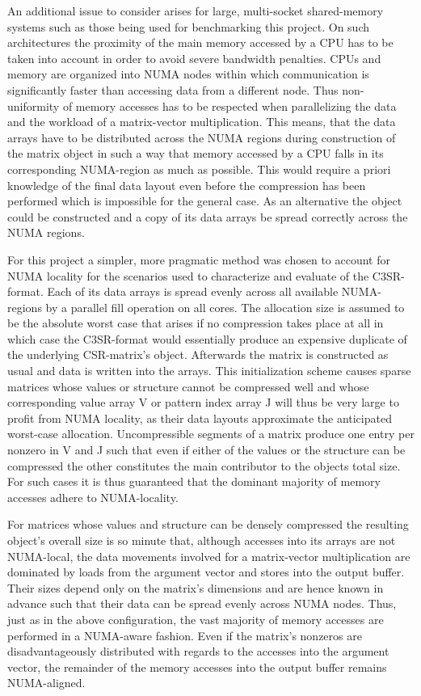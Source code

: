     An additional issue to consider arises for large, multi-socket shared-memory systems such as those being used for
    benchmarking this project. On such architectures the proximity of the main memory accessed by a CPU has to be taken
    into account in order to avoid severe bandwidth penalties. CPUs and memory are organized into NUMA nodes within
    which communication is significantly faster than accessing data from a different node. Thus non-uniformity of memory
    accesses has to be respected when parallelizing the data and the workload of a matrix-vector multiplication. This
    means, that the data arrays have to be distributed across the NUMA regions during construction of the matrix object
    in such a way that memory accessed by a CPU falls in its corresponding NUMA-region as much as possible. This
    would require a priori knowledge of the final data layout even before the compression has been performed which is
    impossible for the general case. As an alternative the object could be constructed and a copy of its data arrays be
    spread correctly across the NUMA regions.

    For this project a simpler, more pragmatic method was chosen to account for NUMA locality for the scenarios used to
    characterize and evaluate of the C3SR-format. Each of its data arrays is spread evenly across all available
    NUMA-regions by a parallel fill operation on all cores. The allocation size is assumed to be the absolute worst case
    that arises if no compression takes place at all in which case the C3SR-format would essentially produce an
    expensive duplicate of the underlying CSR-matrix's object. Afterwards the matrix is constructed as usual and data
    is written into the arrays. This initialization scheme causes sparse matrices whose values or structure cannot be
    compressed well and whose corresponding value array V or pattern index array J will thus be very large to profit
    from NUMA locality, as their data layouts approximate the anticipated worst-case allocation. Uncompressible segments
    of a matrix produce one entry per nonzero in V and J such that even if either of the values or the structure can be
    compressed the other constitutes the main contributor to the objects total size. For such cases it is thus
    guaranteed that the dominant majority of memory accesses adhere to NUMA-locality.

    For matrices whose values and structure can be densely compressed the resulting object's overall size is so minute
    that, although accesses into its arrays are not NUMA-local, the data movements involved for a matrix-vector
    multiplication are dominated by loads from the argument vector and stores into the output buffer. Their sizes depend
    only on the matrix's dimensions and are hence known in advance such that their data can be spread evenly across NUMA
    nodes. Thus, just as in the above configuration, the vast majority of memory accesses are performed in a NUMA-aware
    fashion. Even if the matrix's nonzeros are disadvantageously distributed with regards to the accesses into the
    argument vector, the remainder of the memory accesses into the output buffer remains NUMA-aligned.

